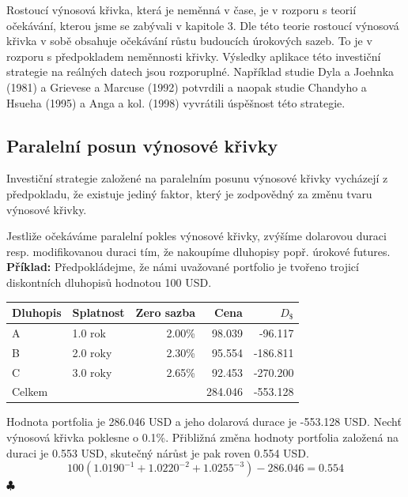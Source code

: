 \documentclass[a4paper]{book}
\begin{document}
Rostoucí výnosová křivka, která je neměnná v čase, je v rozporu s teorií očekávání, kterou jsme se zabývali v kapitole 3. Dle této teorie rostoucí výnosová křivka v sobě obsahuje očekávání růstu budoucích úrokových sazeb. To je v rozporu s předpokladem neměnnosti křivky. Výsledky aplikace této investiční strategie na reálných datech jsou rozporuplné. Například studie Dyla a Joehnka (1981) a Grievese a Marcuse (1992) potvrdili a naopak studie Chandyho a Hsueha (1995) a Anga a kol. (1998) vyvrátili úspěšnost této strategie.

\subsection{Paralelní posun výnosové křivky}

Investiční strategie založené na paralelním posunu výnosové křivky vycházejí z předpokladu, že existuje jediný faktor, který je zodpovědný za změnu tvaru výnosové křivky.

Jestliže očekáváme paralelní pokles výnosové křivky, zvýšíme dolarovou duraci resp. modifikovanou duraci tím, že nakoupíme dluhopisy popř. úrokové futures.\\

\noindent \textbf{Příklad:} Předpokládejme, že námi uvažované portfolio je tvořeno trojicí diskontních dluhopisů hodnotou 100 USD.
\begin{center}
\begin{tabular}{l l r r r}
\textbf{Dluhopis} & \textbf{Splatnost}  & \textbf{Zero sazba} & \textbf{Cena} & \textbf{$D_{\$}$}\\
\hline
A      & 1.0 rok  & 2.00\% &  98.039 &  -96.117 \\
B      & 2.0 roky & 2.30\% &  95.554 & -186.811 \\
C      & 3.0 roky & 2.65\% &  92.453 & -270.200 \\
Celkem &          &        & 284.046 & -553.128 \\
\end{tabular}
\end{center}
Hodnota portfolia je 286.046 USD a jeho dolarová durace je -553.128 USD. Nechť výnosová křivka poklesne o 0.1\%. Přibližná změna hodnoty portfolia založená na duraci je 0.553 USD, skutečný nárůst je pak roven 0.554 USD.
\begin{equation*}
100 (1.0190^{-1} + 1.0220^{-2} + 1.0255^{-3}) - 286.046  = 0.554
\end{equation*}
$\clubsuit$\\
\end{document}
